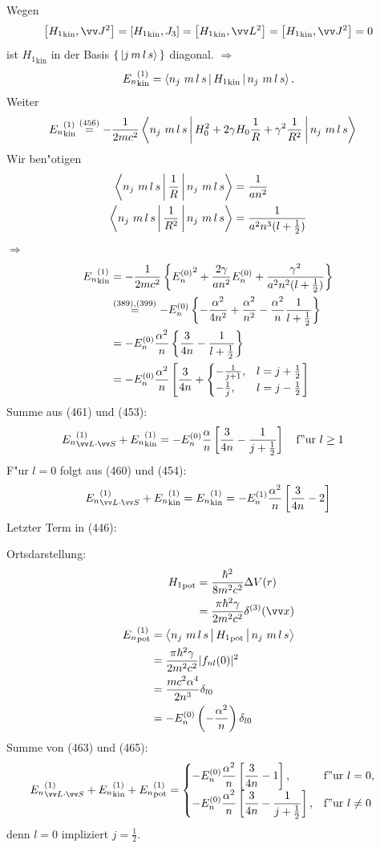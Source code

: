 \documentclass[a4paper]{scrartcl}
\newcommand{\eqn}[1]{\begin{align} #1 \end{align}}
\newcommand{\spl}[1]{\begin{split} #1 \end{split}}
\begin{document}
Wegen 
\eqn{ \left[ {H_1}_\mathrm{kin}, \vv J^2 \right] = \left[ {H_1}_\mathrm{kin}, J_3 \right] = \left[ {H_1}_\mathrm{kin}, \vv L^2 \right] = \left[ {H_1}_\mathrm{kin} , \vv J^2 \right] = 0}
ist ${H_1}_\mathrm{kin}$ in der Basis $\set{ \Ket{ j \, m \, l \, s }}$ diagonal.
$\Longrightarrow$
$${E_n}_\mathrm{kin}^{(1)} = \Braket{ n_j \ m \, l \, s | {H_1}_\mathrm{kin} | n_j \ m \, l \, s}.$$
Weiter
\eqn{
{E_n}_\mathrm{kin}^{(1)} & \stackrel{(456)}= - \frac1{2mc^2} \Braket{ n_j \ m \, l \, s | H_0^2 + 2 \gamma H_0 \frac 1R + \gamma^2 \frac1{R^2} | n_j \ m \, l \, s}}
Wir ben"otigen
\eqn{ \spl{
\Braket{ n_j \ m \, l \, s | \frac 1R | n_j \ m \, l \, s} & = \frac1{an^2} \\
\Braket{ n_j \ m \, l \, s | \frac 1{R^2} | n_j \ m \, l \, s} & = \frac1{a^2n^3(l+\frac12)}
}}
$\Longrightarrow$
\eqn{ 
{E_n}_\mathrm{kin}^{(1)} & = - \frac1{2mc^2} \left\{ {E_n^{(0)}}^2 + \frac{2 \gamma}{an^2} E_n^{(0)} + \frac{\gamma^2}{a^2n^2(l+\frac12)} \right\} \notag\\
& \stackrel{(389), (399)}= - E_n^{(0)} \left\{ - \frac{\alpha^2}{4n^2} + \frac{\alpha^2}{n^2} - \frac{\alpha^2}{n} \frac1{l +\frac12} \right\} \notag \\
& = - E_n^{(0)} \frac{\alpha^2}n \left\{ \frac3{4n} - \frac1{l+\frac12} \right\} \\
& = - E_n^{(0)} \frac{\alpha^2}n \left[ \frac3{4n} + \begin{cases} - \frac1{j+1}, & l=j+\frac12 \\ - \frac1j, & l=j-\frac12 \end{cases} \right]
}
Summe aus (461) und (453):
\eqn{{E_n}_{\vv L \cdot \vv S}^{(1)} + {E_n}_\mathrm{kin}^{(1)} & = - E_n^{(0)} \frac \alpha n \left[ \frac3{4n} - \frac1{j+\frac12} \right] \quad \mathrm{f"ur \ } l \geq 1}
F"ur $l=0$ folgt aus (460) und (454):
\eqn{ {E_n}_{\vv L \cdot \vv S}^{(1)} + {E_n}_\mathrm{kin}^{(1)} = {E_n}_\mathrm{kin}^{(1)} = - E_n^{(1)} \frac{\alpha^2}n \left[ \frac3{4n} - 2 \right]}
Letzter Term in (446):

Ortsdarstellung:
\eqn{
\spl{ 
{H_1}_\mathrm{pot} & = \frac{\hbar^2}{8m^2 c^2} \Delta V(r) \\
& = \frac{\pi \hbar^2 \gamma}{2 m^2 c^2} \delta^{(3)}(\vv x)
} \\
\spl{
{E_n}_\mathrm{pot}^{(1)} & = \Braket{ n_j \ m \, l \, s | {H_1}_\mathrm{pot} | n_j \ m \, l \, s } \\
& = \frac{\pi \hbar^2 \gamma}{2m^2 c^2} \vert f_{nl}(0) \vert^2 \\
& = \frac{mc^2 \alpha^4}{2n^3} \delta_{l0} \\
& = - E_n^{(0)} \left( - \frac{\alpha^2}n \right) \delta_{l0}
}
}
Summe von (463) und (465):
\eqn{ 
{E_n}^{(1)}_{\vv L \cdot \vv S} + {E_n}_\mathrm{kin}^{(1)} + {E_n}_\mathrm{pot}^{(1)} & = \begin{cases} \displaystyle- E_n^{(0)} \frac{\alpha^2}n \left[ \frac3{4n} - 1 \right], & \mathrm{f"ur \ } l=0, \\
\displaystyle -E_n^{(0)} \frac{\alpha^2}n \left[ \frac3{4n} - \frac1{j+ \frac12} \right], & \mathrm{f"ur \ } l \neq 0 \end{cases}}
denn $l=0$ impliziert $j=\frac12$.
\end{document}
